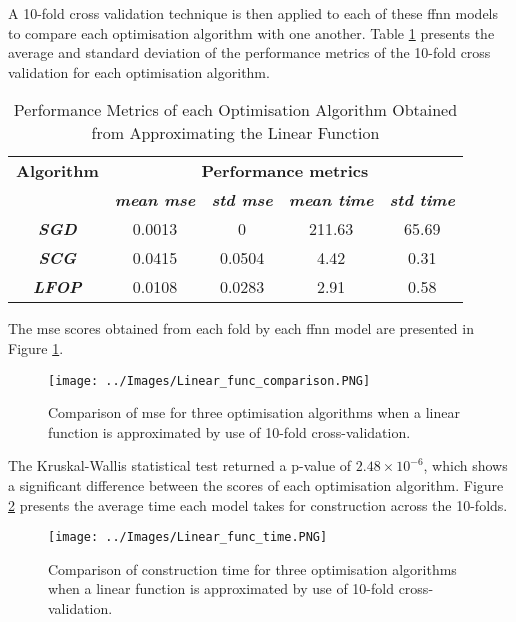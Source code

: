 \documentclass[10pt, conference]{IEEEtran}
\begin{document}
A 10-fold cross validation technique is then applied to each of these \acrshort{ffnn} models to compare each
optimisation algorithm with one another. Table \ref{table: Linear_performance_metrics} presents the average
and standard deviation of the performance metrics of the 10-fold cross validation for each optimisation algorithm.
\begin{table}[H]
    \caption{Performance Metrics of each Optimisation Algorithm Obtained from Approximating the Linear Function}
    \begin{center}
        \begin{tabular}{|c||c|c|c|c|}
            \hline
            \textbf{Algorithm}&\multicolumn{4}{|c|}{\textbf{Performance metrics}} \\
            \cline{2-5}
                        & \textbf{\textit{mean mse}} & \textbf{\textit{std mse}} & \textbf{\textit{mean time}} & \textbf{\textit{std time}}\\
            \hline
            \textbf{\textit{SGD}}  & 0.0013 & 0 & 211.63 & 65.69\\
            \textbf{\textit{SCG}}  & 0.0415 & 0.0504 & 4.42 & 0.31\\
            \textbf{\textit{LFOP}} & 0.0108 & 0.0283 & 2.91 & 0.58\\
            \hline
        \end{tabular}
    \end{center}
    \label{table: Linear_performance_metrics}
\end{table}

The \acrshort{mse} scores obtained from each fold by each \acrshort{ffnn}
model are presented in Figure \ref{fig:Linear_function_comparison}.
\begin{figure}[H]
    \centerline{\texttt{[image: ../Images/Linear\_func\_comparison.PNG]}}
    \caption{Comparison of \acrshort{mse} for three optimisation algorithms when a linear function is approximated by use of 10-fold cross-validation.}
    \label{fig:Linear_function_comparison}
\end{figure}
The Kruskal-Wallis statistical test returned a p-value of $2.48\times10^{-6}$, which shows a significant
difference between the scores of each optimisation algorithm. Figure \ref{fig:Linear_function_time}
presents the average time each model takes for construction across the 10-folds.
\begin{figure}[H]
    \centerline{\texttt{[image: ../Images/Linear\_func\_time.PNG]}}
    \caption{Comparison of construction time for three optimisation algorithms when a linear function is approximated by use of 10-fold cross-validation.}
    \label{fig:Linear_function_time}
\end{figure}
\end{document}
